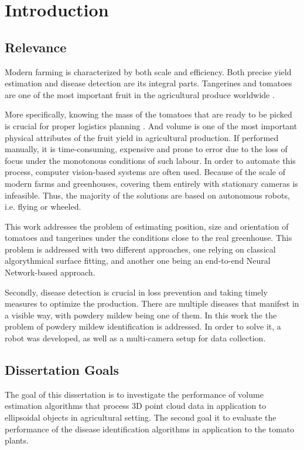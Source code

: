 \chapter{Introduction}

\section{Relevance}

Modern farming is characterized by both scale and efficiency.
Both precise yield estimation and disease detection are its integral parts.
Tangerines and tomatoes are one of the most important fruit in the agricultural produce worldwide \cite{li2025metafruit}.

More specifically, knowing the mass of the tomatoes that are ready to be picked is crucial for proper logistics planning \cite{tahir2021comprehensive}.
And volume is one of the most important physical attributes of the fruit yield in agricultural production.
If performed manually, it is time-consuming, expensive and prone to error due to the loss of focus under the monotonous conditions of such labour.
In order to automate this process, computer vision-based systems are often used.
Because of the scale of modern farms and greenhouses, covering them entirely with stationary cameras is infeasible.
Thus, the majority of the solutions are based on autonomous robots, i.e. flying or wheeled.

This work addresses the problem of estimating position, size and orientation of tomatoes and tangerines under the conditions close to the real greenhouse.
This problem is addressed with two different approaches, one relying on classical algorythmical surface fitting, and another one being an end-to-end Neural Network-based approach.

Secondly, disease detection is crucial in loss prevention and taking timely measures to optimize the production.
There are multiple diseases that manifest in a visible way, with powdery mildew being one of them.
In this work the the problem of powdery mildew identification is addressed.
In order to solve it, a robot was developed, as well as a multi-camera setup for data collection.

\section{Dissertation Goals}

The goal of this dissertation is to investigate the performance of volume estimation algorithms that process 3D point cloud data in application to ellipsoidal objects in agricultural setting.
The second goal it to evaluate the performance of the disease identification algorithms in application to the tomato plants.

